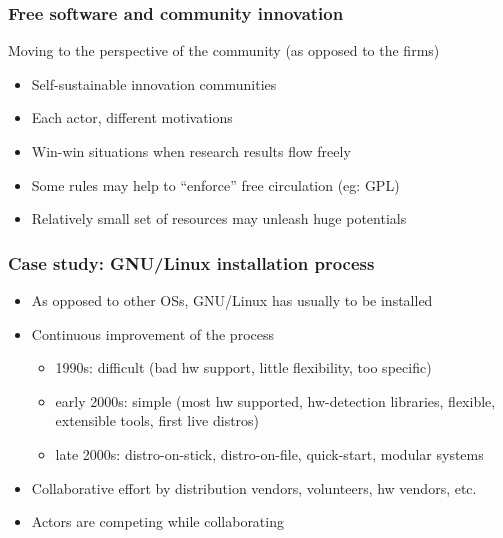 
\begin{frame}
\frametitle{Free software and community innovation}

Moving to the perspective of the community (as opposed to the firms)

\begin{itemize}
\item Self-sustainable innovation communities
\item Each actor, different motivations
\item Win-win situations when research results flow freely
\item Some rules may help to ``enforce'' free circulation (eg: GPL)
\item Relatively small set of resources may unleash huge potentials
\end{itemize}

\end{frame}


\begin{frame}
\frametitle{Case study: GNU/Linux installation process}

\begin{itemize}
\item As opposed to other OSs, GNU/Linux has usually to be installed
\item Continuous improvement of the process
  \begin{itemize}
  \item 1990s: difficult (bad hw support, little flexibility, too specific)
  \item early 2000s: simple (most hw supported, hw-detection libraries, flexible, extensible tools, first live distros)
  \item late 2000s: distro-on-stick, distro-on-file, quick-start, modular systems
  \end{itemize}
\item Collaborative effort by distribution vendors, volunteers, hw vendors, etc.
\item Actors are competing while collaborating
\end{itemize}

\end{frame}


